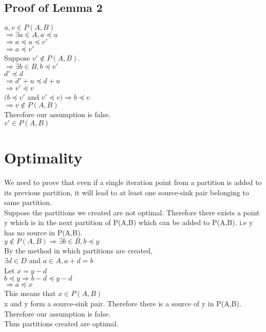 \subsection{Proof of Lemma 2}
$u,v \in P(A,B)$ \\
$\Rightarrow \exists a \in A , a \preceq u$ \\
$ \Rightarrow a \preceq u \preceq v'$ \\
$ \Rightarrow a \preceq v' $ \\

Suppose $v' \notin P(A,B)$. \\
$ \Rightarrow \exists b \in B, b \preceq v'$ \\
$ d' \preceq d $ \\
$ \Rightarrow d' + u \preceq d + u $ \\
$ \Rightarrow v' \preceq v$ \\
$ (b \preceq v'$ and $v' \preceq v) \Rightarrow b \preceq v$ \\ 
$ \Rightarrow v \notin P(A, B)$ \\
Therefore our assumption is false. \\
$v' \in P(A,B)$ \\

\section{Optimality}
We need to prove that even if a single iteration point from a partition is added to its previous partition, it will lead to at least one source-sink pair belonging to same partition. \\

Suppose the partitions we created are not optimal. 
Therefore there exists a point y which is in the next partition of P(A,B) which can be added to P(A,B). i.e y has no source in P(A,B). \\

\noindent $y \notin P(A,B) \Rightarrow  \exists b \in B, b \preceq y$ \\
By the method in which partitions are created, \\
$ \exists d \in D$ and $a \in A, a + d = b$ \\
Let $x = y - d$ \\
$ b \preceq y \Rightarrow b - d \preceq y - d$ \\
$ \Rightarrow a \preceq x$ \\
This means that $x \in P(A,B)$ \\
x and y form a source-sink pair. Therefore there is a source of y in P(A,B).
Therefore our assumption is false. \\

Thus partitions created are optimal.\\